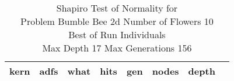 \begin{table}[H]
\caption{Shapiro Test of Normality for \\ Problem  Bumble Bee 2d  Number of Flowers 10\\Best of Run Individuals \\ Max Depth 17 Max Generations 156\\}
\begin{center}
\scalebox{0.8} %
{
\begin{tabular}{lrrrrrrr}
\hline
kern & adfs & what & hits & gen & nodes & depth \\
\hline


\end{tabular}
}
\end{center}
\end{table}

